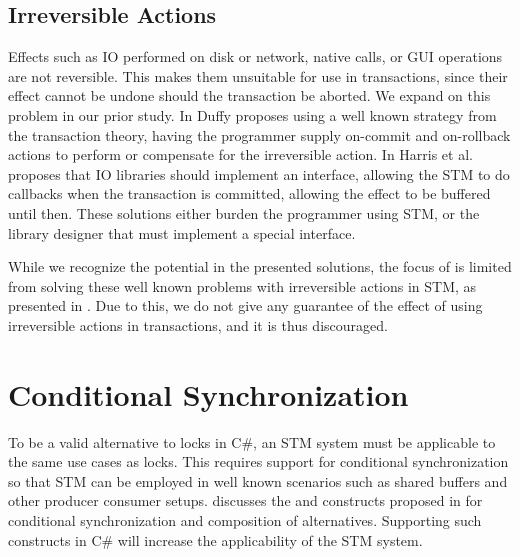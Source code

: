 \subsection{Irreversible Actions}
Effects such as \ac{IO} performed on disk or network, native calls, or GUI operations are not reversible. This makes them unsuitable for use in transactions, since their effect cannot be undone should the transaction be aborted. We expand on this problem in our prior study\cite[p. 51-52]{dpt907e14trending}. In \cite{duffy2010stmnet} Duffy proposes using a well known strategy from the transaction theory\cite{reuter1993transaction}, having the programmer supply on-commit and on-rollback actions to perform or compensate for the irreversible action. In \cite{harris2005exceptions} Harris et al. proposes that \ac{IO} libraries should implement an interface, allowing the \ac{STM} to do callbacks when the transaction is committed, allowing the effect to be buffered until then. These solutions either burden the programmer using \ac{STM}, or the library designer that must implement a special interface.

While we recognize the potential in the presented solutions, the focus of \stmnamesp is limited from solving these well known problems with irreversible actions in \ac{STM}, as presented in . Due to this, we do not give any guarantee of the effect of using  irreversible actions in transactions, and it is thus discouraged.

\section{Conditional Synchronization}
\label{sec:req_conditional}
To be a valid alternative to locks in C\#, an \ac{STM} system must be applicable to the same use cases as locks. This requires support for conditional synchronization so that \ac{STM} can be employed in well known scenarios such as shared buffers and other producer consumer setups\cite[p. 128]{tanenbaum2008modern}.  discusses the  and  constructs proposed in \cite{harris2005composable} for conditional synchronization and composition of alternatives. Supporting such constructs in C\# will increase the applicability of the \ac{STM} system.

